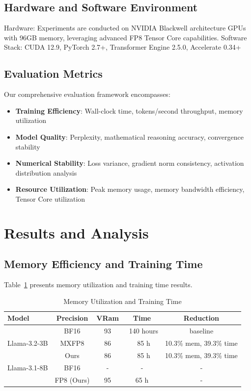 \documentclass[conference]{IEEEtran}
\begin{document}
\subsection{Hardware and Software Environment}

Hardware: Experiments are conducted on NVIDIA Blackwell architecture GPUs with 96GB memory, leveraging advanced FP8 Tensor Core capabilities.
Software Stack: CUDA 12.9, PyTorch 2.7+, Transformer Engine 2.5.0, Accelerate 0.34+

\subsection{Evaluation Metrics}

Our comprehensive evaluation framework encompasses:

\begin{itemize}
\item \textbf{Training Efficiency}: Wall-clock time, tokens/second throughput, memory utilization
\item \textbf{Model Quality}: Perplexity, mathematical reasoning accuracy, convergence stability
\item \textbf{Numerical Stability}: Loss variance, gradient norm consistency, activation distribution analysis
\item \textbf{Resource Utilization}: Peak memory usage, memory bandwidth efficiency, Tensor Core utilization
\end{itemize}

\section{Results and Analysis}
\subsection{Memory Efficiency and Training Time}

Table~\ref{tab:memory_scaling} presents memory utilization and training time results.

\begin{table}[htbp]
\centering
\caption{Memory Utilization and Training Time}
\begin{tabular}{@{}lcccc@{}}
\toprule
\textbf{Model} & \textbf{Precision} & \textbf{VRam} & \textbf{Time} & \textbf{Reduction} \\
\midrule
\multirow{3}{*}{Llama-3.2-3B} & BF16 & 93 & ~140 hours & baseline \\
 & MXFP8 & 86 & ~85 h & 10.3\% mem, 39.3\% time \\
 & Ours & 86 & ~85 h & 10.3\% mem, 39.3\% time \\
\midrule
Llama-3.1-8B & BF16 & - & - & - \\
 & FP8 (Ours) & 95 & 65 h & - \\
\bottomrule
\end{tabular}
\label{tab:memory_scaling}
\end{table}
\end{document}
